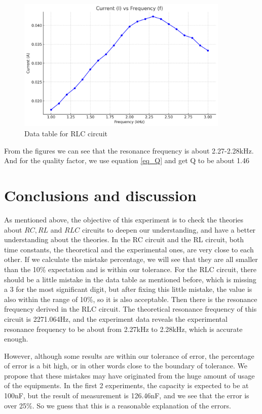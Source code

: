 \documentclass[12pt, a4paper, oneside]{article}
\begin{document}
\begin{figure}[htbp]
	\centering
	\includegraphics[width=0.9\textwidth]{C6.png}
	\caption{Data table for RLC circuit}
\end{figure}

From the figures we can see that the resonance frequency is about 2.27-2.28kHz. And for the 
quality factor, we use equation \ref{eq_Q} and get Q to be about 1.46

\section{Conclusions and discussion}
\indent

As mentioned above, the objective of this experiment is to check the theories about $RC,RL$ and $RLC$ circuits to deepen our understanding, and have a better understanding 
about the theories. In the RC circuit and the RL circuit, both time constants,
the theoretical and the experimental ones, are very close to each other. If we 
calculate the mistake percentage, we will see that they are all smaller than the 
10\% expectation and is within our tolerance. For the RLC circuit, there should 
be a little mistake in the data table as mentioned before, which is missing a 3 for 
the most significant digit, but after fixing this little mistake, the value is
also within the range of 10\%, so it is also acceptable. 
Then there is the resonance frequency derived in the RLC circuit. The theoretical
resonance frequency of this circuit is 2271.064Hz, and the experiment data reveals
the experimental resonance frequency to be about from 2.27kHz to 2.28kHz, which is 
accurate enough. 

However, although some results are within our tolerance of error, the percentage
of error is a bit high, or in other words close to the boundary of tolerance. We propose
that these mistakes may have originated from the huge amount of usage of the equipments.
In the first 2 experiments, the capacity is expected to be at 100nF, but the result 
of measurement is 126.46nF, and we see that the error is over 25\%. So we guess
that this is a reasonable explanation of the errors. 
\end{document}
